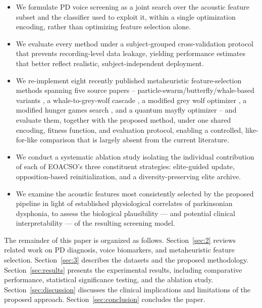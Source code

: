\begin{itemize}
  \item We formulate PD voice screening as a joint search over the
    acoustic feature subset and the classifier used to exploit it, within
    a single optimization encoding, rather than optimizing feature
    selection alone.
  \item We evaluate every method under a subject-grouped cross-validation
    protocol that prevents recording-level data leakage, yielding
    performance estimates that better reflect realistic,
    subject-independent deployment.
  \item We re-implement eight recently published metaheuristic
    feature-selection methods spanning five source papers --
    particle-swarm/butterfly/whale-based variants \cite{Hashemi:2026}, a
    whale-to-grey-wolf cascade \cite{AlNajjar:2024}, a modified grey wolf
    optimizer \cite{Santhosh:2025}, a modified hunger games search
    \cite{Hashim:2023}, and a quantum mayfly optimizer \cite{Mansour:2024}
    -- and evaluate them, together with the proposed method, under one
    shared encoding, fitness function, and evaluation protocol, enabling
    a controlled, like-for-like comparison that is largely absent from
    the current literature.
  \item We conduct a systematic ablation study isolating the individual
    contribution of each of EOACSO's three constituent strategies:
    elite-guided update, opposition-based reinitialization, and a
    diversity-preserving elite archive.
  \item We examine the acoustic features most consistently selected by
    the proposed pipeline in light of established physiological
    correlates of parkinsonian dysphonia, to assess the biological
    plausibility --- and potential clinical interpretability --- of the
    resulting screening model.
\end{itemize}

The remainder of this paper is organized as follows.
Section~\ref{sec:2} reviews related work on PD diagnosis,
voice biomarkers, and metaheuristic feature selection.
Section~\ref{sec:3} describes the datasets and the proposed
methodology. Section~\ref{sec:results} presents the experimental
results, including comparative performance, statistical significance
testing, and the ablation study. Section~\ref{sec:discussion} discusses
the clinical implications and limitations of the proposed approach.
Section~\ref{sec:conclusion} concludes the paper.

